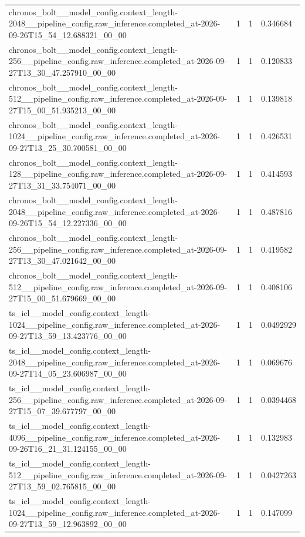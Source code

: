 \begin{tabular}{llll}
chronos\_bolt\_\_model\_config.context\_length-2048\_\_pipeline\_config.raw\_inference.completed\_at-2026-09-26T15\_54\_12.688321\_00\_00 & 1 & 1 & 0.346684 \\
chronos\_bolt\_\_model\_config.context\_length-256\_\_pipeline\_config.raw\_inference.completed\_at-2026-09-27T13\_30\_47.257910\_00\_00 & 1 & 1 & 0.120833 \\
chronos\_bolt\_\_model\_config.context\_length-512\_\_pipeline\_config.raw\_inference.completed\_at-2026-09-27T15\_00\_51.935213\_00\_00 & 1 & 1 & 0.139818 \\
chronos\_bolt\_\_model\_config.context\_length-1024\_\_pipeline\_config.raw\_inference.completed\_at-2026-09-27T13\_25\_30.700581\_00\_00 & 1 & 1 & 0.426531 \\
chronos\_bolt\_\_model\_config.context\_length-128\_\_pipeline\_config.raw\_inference.completed\_at-2026-09-27T13\_31\_33.754071\_00\_00 & 1 & 1 & 0.414593 \\
chronos\_bolt\_\_model\_config.context\_length-2048\_\_pipeline\_config.raw\_inference.completed\_at-2026-09-26T15\_54\_12.227336\_00\_00 & 1 & 1 & 0.487816 \\
chronos\_bolt\_\_model\_config.context\_length-256\_\_pipeline\_config.raw\_inference.completed\_at-2026-09-27T13\_30\_47.021642\_00\_00 & 1 & 1 & 0.419582 \\
chronos\_bolt\_\_model\_config.context\_length-512\_\_pipeline\_config.raw\_inference.completed\_at-2026-09-27T15\_00\_51.679669\_00\_00 & 1 & 1 & 0.408106 \\
ts\_icl\_\_model\_config.context\_length-1024\_\_pipeline\_config.raw\_inference.completed\_at-2026-09-27T13\_59\_13.423776\_00\_00 & 1 & 1 & 0.0492929 \\
ts\_icl\_\_model\_config.context\_length-2048\_\_pipeline\_config.raw\_inference.completed\_at-2026-09-27T14\_05\_23.606987\_00\_00 & 1 & 1 & 0.069676 \\
ts\_icl\_\_model\_config.context\_length-256\_\_pipeline\_config.raw\_inference.completed\_at-2026-09-27T15\_07\_39.677797\_00\_00 & 1 & 1 & 0.0394468 \\
ts\_icl\_\_model\_config.context\_length-4096\_\_pipeline\_config.raw\_inference.completed\_at-2026-09-26T16\_21\_31.124155\_00\_00 & 1 & 1 & 0.132983 \\
ts\_icl\_\_model\_config.context\_length-512\_\_pipeline\_config.raw\_inference.completed\_at-2026-09-27T13\_59\_02.765815\_00\_00 & 1 & 1 & 0.0427263 \\
ts\_icl\_\_model\_config.context\_length-1024\_\_pipeline\_config.raw\_inference.completed\_at-2026-09-27T13\_59\_12.963892\_00\_00 & 1 & 1 & 0.147099 \\

\end{tabular}
